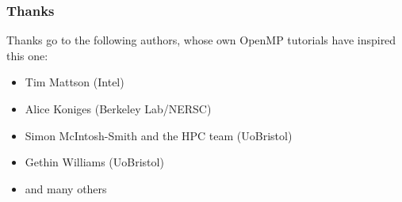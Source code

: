 \documentclass[aspectratio=169]{beamer}
\begin{document}


\begin{frame}
\frametitle{Thanks}
Thanks go to the following authors, whose own OpenMP tutorials have inspired this one:
\begin{itemize}
  \item Tim Mattson (Intel)
  \item Alice Koniges (Berkeley Lab/NERSC)
  \item Simon McIntosh-Smith and the HPC team (UoBristol)
  \item Gethin Williams (UoBristol)
  \item and many others
\end{itemize}
\end{frame}
\end{document}
